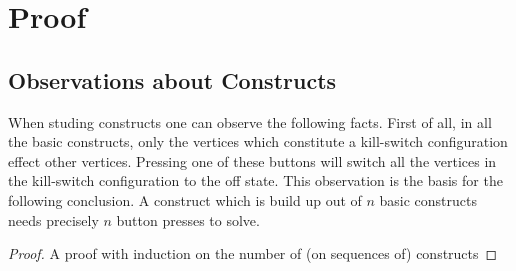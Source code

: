 \section{Proof}

\subsection{Observations about Constructs}

When studing constructs one can observe the following facts. First of all,
in all the basic constructs, only the vertices which constitute a kill-switch
configuration effect other vertices. Pressing one of these buttons will switch
all the vertices in the kill-switch configuration to the off state.
This observation is the basis for the following conclusion. A construct which is
build up out of $n$ basic constructs needs precisely $n$ button presses to 
solve.

\begin{proof}
	A proof with induction on the number of (on sequences of) constructs
\end{proof}
